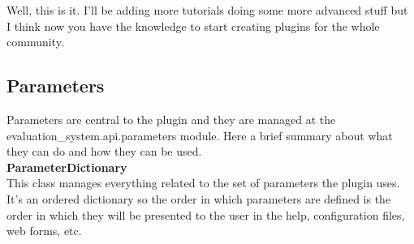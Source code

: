 \documentclass[a4paper,11pt]{ltxdoc}
\begin{document}
Well, this is it. I'll be adding more tutorials doing some more advanced stuff but I think now you have the knowledge to start creating plugins for the whole community. 

\subsection{Parameters}
Parameters are central to the plugin and they are managed at the evaluation\_system.api.parameters module. Here a brief summary about what they can do and how they can be used.
\\
\textbf{ParameterDictionary}\\
This class manages everything related to the set of parameters the plugin uses. It's an ordered dictionary so the order in which parameters are defined is the order in which they will be presented to the user in the help, configuration files, web forms, etc.
\end{document}
